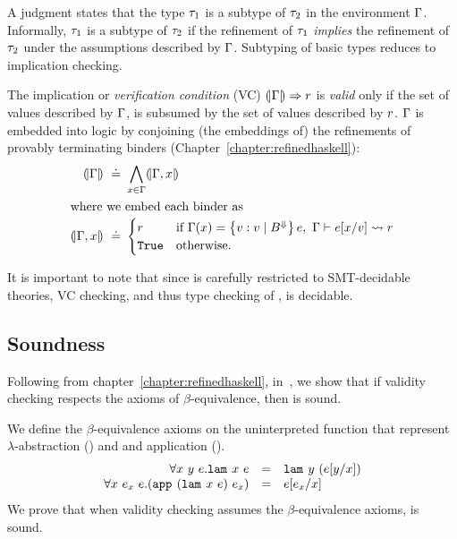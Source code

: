 A judgment  states
that the type $\typ_1$ is a subtype of %
$\typ_2$ in the environment $\env$.
%
Informally, $\typ_1$ is a subtype of $\typ_2$ if
the refinement of $\typ_1$ \emph{implies}
the refinement of $\typ_2$
under the assumptions described by $\env$.
%
Subtyping of basic types reduces to implication checking.

The implication or \emph{verification condition} (VC)
${\vcond{\env}{\pred}}$
is \emph{valid} only if the set of values
described by $\env$, is subsumed by
the set of values described by $\pred$.
%
$\env$ is embedded into logic by conjoining
(the embeddings of) the refinements of
provably terminating binders (Chapter~\ref{chapter:refinedhaskell}):
%
\begin{align*}
\embed{\env} \defeq & \bigwedge_{x \in \env} \embed{\env, x} \\
\intertext{where we embed each binder as}
\embed{\env, x} \defeq & \begin{cases}
                           \pred  & \text{if } \env(x)=\tref{v}{\btyp^{\tlabel}}{e},\
                                    \tologicshort{\env}{e\subst{v}{x}}{\btyp}{\pred}{\embed{\btyp}}{\smtenv}{\axioms} \\
                           \etrue & \text{otherwise}.
                         \end{cases}
\end{align*}


It is important to note that since \smtlan
is carefully restricted to SMT-decidable theories,
VC checking, and thus type checking of \corelan, is decidable.

\subsection{Soundness}

Following \undeclang from chapter~\ref{chapter:refinedhaskell}, in~\citep{vazou16techrep}, we show that
if validity checking respects the axioms of $\beta$-equivalence,
then \corelan is sound.

We define the $\beta$-equivalence axioms on the uninterpreted function
that represent $\lambda$-abstraction (\smtlamname{}{}) and
and application (\smtappname{}{}).
$$
\begin{array}{rcl}
\forall x\ y\ e. \smtlamname{}{}\ x\ e
  & = & \smtlamname{}{}\ y\ (e\subst{x}{y}) \\
\forall x\ e_x\ e. (\smtappname{}{}\ (\smtlamname{}{}\ x\ e)\ e_x)
  & = &  e\subst{x}{e_x}
\end{array}
$$
%
 We prove that when validity checking assumes the $\beta$-equivalence
 axioms, \corelan is sound.

